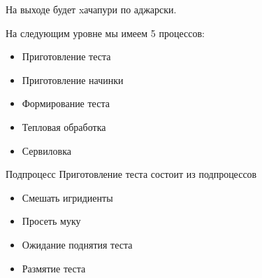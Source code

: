 На выходе будет xачапури по аджарски.


\newpage

На следующим уровне мы имеем 5 процессов:
\begin{itemize}
	\item Приготовление теста
	\item Приготовление начинки
	\item Формирование теста
	\item Тепловая обработка
	\item Сервиловка
\end{itemize}


\newpage

Подпроцесс Приготовление теста состоит из подпроцессов
\begin{itemize}
	\item Смешать игридиенты
	\item Просеть муку
	\item Ожидание поднятия теста
	\item Размятие теста
\end{itemize}



